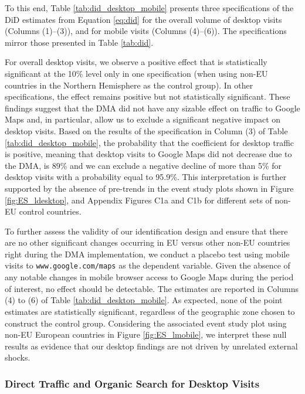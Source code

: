\documentclass[11pt]{article}
\begin{document}
	
	To this end, Table \ref{tab:did_desktop_mobile} presents three specifications of the DiD estimates from Equation \ref{eq:did} for the overall volume of desktop visits (Columns (1)–(3)), and for mobile visits (Columns (4)–(6)). The specifications mirror those presented in Table \ref{tab:did}. 
	
	For overall desktop visits, we observe a positive effect that is statistically significant at the 10\% level only in one specification (when using non-EU countries in the Northern Hemisphere as the control group). In other specifications, the effect remains positive but not statistically significant. These findings suggest that the DMA did not have any sizable effect on traffic to Google Maps and, in particular, allow us to exclude a significant negative impact on desktop visits. Based on the results of the specification in Column (3) of Table \ref{tab:did_desktop_mobile}, the probability that the coefficient for desktop traffic is positive, meaning that desktop visits to Google Maps did not decrease due to the DMA, is 89\% and we can exclude a negative decline of more than 5\% for desktop visits with a probability equal to 95.9\%. This interpretation is further supported by the absence of pre-trends in the event study plots shown in Figure \ref{fig:ES_ldesktop}, and Appendix Figures C1a and C1b for different sets of non-EU control countries.
	
	To further assess the validity of our identification design and ensure that there are no other significant changes occurring in EU versus other non-EU countries right during the DMA implementation, we conduct a placebo test using mobile visits to \texttt{www.google.com/maps} as the dependent variable. Given the absence of any notable changes in mobile browser access to Google Maps during the period of interest, no effect should be detectable. The estimates are reported in Columns (4) to (6) of Table \ref{tab:did_desktop_mobile}. As expected, none of the point estimates are statistically significant, regardless of the geographic zone chosen to construct the control group. Considering the associated event study plot using non-EU European countries in  Figure \ref{fig:ES_lmobile}, we interpret these null results as evidence that our desktop findings are not driven by unrelated external shocks.
	
	
	\subsubsection{Direct Traffic and Organic Search for Desktop Visits} \label{subsec:google_maps_direct_organic}
	
\end{document}

